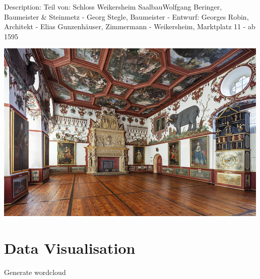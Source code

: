 \documentclass[
  letterpaper,
]{book}
\begin{document}
Description: Teil von: Schloss Weikersheim SaalbauWolfgang Beringer,
Baumeister \& Steinmetz - Georg Stegle, Baumeister - Entwurf: Georges
Robin, Architekt - Elias Gunzenhäuser, Zimmermann - Weikersheim,
Marktplatz 11 - ab 1595

\includegraphics{paintings_files/figure-pdf/cell-3-output-116.png}


\chapter{Data Visualisation}\label{data-visualisation}

Generate wordcloud
\end{document}
